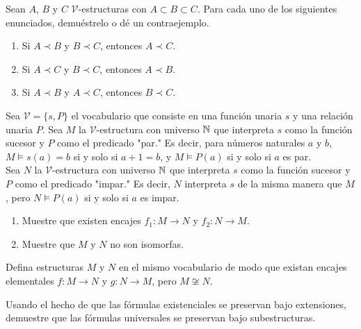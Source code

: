 \message{ !name(main.tex)}\documentclass[12pt,a4paper]{book}
\newcommand{\comillas}[1]{"#1"}
\newcommand{\VV}{\mathcal{V}}
\begin{document}
    \begin{ejercicio}
        Sean $A$, $B$ y $C$ $\VV$-estructuras con $A\subset B\subset C$. Para cada uno de los siguientes enunciados,
        demuéstrelo o dé un contraejemplo.
        \begin{enumerate}[label=(\alph*)]
            \item Si $A\prec B$ y $B\prec C$, entonces $A\prec C$.
            \item Si $A\prec C$ y $B\prec C$, entonces $A\prec B$.
            \item Si $A\prec B$ y $A\prec C$, entonces $B\prec C$.
        \end{enumerate}
    \end{ejercicio}

    \begin{ejercicio}
        Sea $\VV=\{s,P\}$ el vocabulario que consiste en una función unaria $s$ y una relación unaria $P$. Sea $M$ la
        $\VV$-estructura con universo $\mathbb{N}$ que interpreta $s$ como la función sucesor y $P$ como el predicado \comillas{par.}
        Es decir, para números naturales $a$ y $b$, $M\models s(a)=b$ si y solo si $a+1=b$, y $M\models P(a)$ si y solo si
        $a$ es par.\\
        Sea $N$ la $\VV$-estructura con universo $\mathbb{N}$ que interpreta $s$ como la función sucesor y $P$ como el predicado
        \comillas{impar.} Es decir, $N$ interpreta $s$ de la misma manera que $M$, pero $N\models P(a)$ si y solo si $a$
        es impar.
        \begin{enumerate}[label=(\alph*)]
            \item Muestre que existen encajes $f_{1}:M\rightarrow N$ y $f_{2}:N\rightarrow M$.
            \item Muestre que $M$ y $N$ no son isomorfas.
        \end{enumerate}
    \end{ejercicio}

    \begin{ejercicio}
        Defina estructuras $M$ y $N$ en el mismo vocabulario de modo que existan encajes elementales $f:M\rightarrow N$ y
        $g:N\rightarrow M$, pero $M\not\cong N$.
    \end{ejercicio}

    \begin{ejercicio}\label{ej:universal-preservada-completa}
        Usando el hecho de que las fórmulas existenciales se preservan bajo extensiones, demuestre que las fórmulas
        universales se preservan bajo subestructuras.
    \end{ejercicio}
\end{document}
